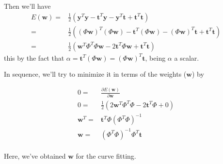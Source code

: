 \begin{frame}{\insertsubsection}
%
Then we'll have 
%
\begin{align*}
E(\mathbf{w}) =& \frac{1}{2} \left( \mathbf{y}^T\mathbf{y} -  \mathbf{t}^T\mathbf{y} - \mathbf{y}^T\mathbf{t} + \mathbf{t}^T\mathbf{t} \right) \\
		   =& \frac{1}{2} \left( ( \Phi \mathbf{w})^T( \Phi \mathbf{w}) -  \mathbf{t}^T( \Phi \mathbf{w}) - ( \Phi \mathbf{w})^T\mathbf{t} + \mathbf{t}^T\mathbf{t} \right) \\
		   =& \frac{1}{2} \left( \mathbf{w}^T \Phi^T \Phi \mathbf{w} -  2\mathbf{t}^T \Phi \mathbf{w} + \mathbf{t}^T\mathbf{t} \right)
\end{align*}
this by the fact that $\alpha =  \mathbf{t}^T( \Phi \mathbf{w}) = ( \Phi \mathbf{w})^T\mathbf{t}$, being $\alpha$ a scalar.

\end{frame}

\begin{frame}{\insertsubsection}
In sequence, we'll try to minimize it in terms of the weights ($\mathbf{w}$) by

\begin{align*}
	0 =& \frac{\partial E(\mathbf{w})}{\partial \mathbf{w}} \\
	0 =& \frac{1}{2} \left( 2 \mathbf{w}^T \Phi^T \Phi  -  2\mathbf{t}^T \Phi + 0 \right) \\
	\mathbf{w}^T =&  \mathbf{t}^T \Phi \left( \Phi^T \Phi \right)^{-1} \\
	\mathbf{w} =& \left( \Phi^T \Phi \right)^{-1}\Phi^T \mathbf{t} \\
\end{align*}

Here, we've obtained $\mathbf{w}$ for the curve fitting.

\end{frame}

\begin{frame}

\end{frame}

